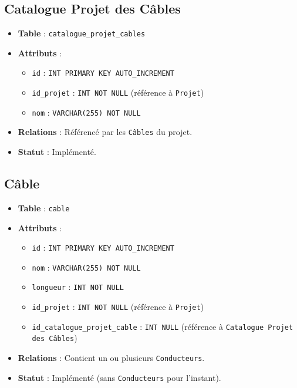 \documentclass[a4paper,12pt]{article}
\begin{document}
\subsection{Catalogue Projet des Câbles}
\begin{itemize}
    \item \textbf{Table} : \texttt{catalogue\_projet\_cables}
    \item \textbf{Attributs} :
    \begin{itemize}
        \item \texttt{id} : \texttt{INT PRIMARY KEY AUTO\_INCREMENT}
        \item \texttt{id\_projet} : \texttt{INT NOT NULL} (référence à \texttt{Projet})
        \item \texttt{nom} : \texttt{VARCHAR(255) NOT NULL}
    \end{itemize}
    \item \textbf{Relations} : Référencé par les \texttt{Câbles} du projet.
    \item \textbf{Statut} : Implémenté.
\end{itemize}

\subsection{Câble}
\begin{itemize}
    \item \textbf{Table} : \texttt{cable}
    \item \textbf{Attributs} :
    \begin{itemize}
        \item \texttt{id} : \texttt{INT PRIMARY KEY AUTO\_INCREMENT}
        \item \texttt{nom} : \texttt{VARCHAR(255) NOT NULL}
        \item \texttt{longueur} : \texttt{INT NOT NULL}
        \item \texttt{id\_projet} : \texttt{INT NOT NULL} (référence à \texttt{Projet})
        \item \texttt{id\_catalogue\_projet\_cable} : \texttt{INT NULL} (référence à \texttt{Catalogue Projet des Câbles})
    \end{itemize}
    \item \textbf{Relations} : Contient un ou plusieurs \texttt{Conducteurs}.
    \item \textbf{Statut} : Implémenté (sans \texttt{Conducteurs} pour l’instant).
\end{itemize}
\end{document}
